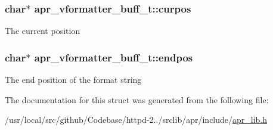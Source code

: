 \subsubsection[{\texorpdfstring{curpos}{curpos}}]{\setlength{\rightskip}{0pt plus 5cm}char$\ast$ apr\+\_\+vformatter\+\_\+buff\+\_\+t\+::curpos}\hypertarget{structapr__vformatter__buff__t_aad69bb2ce382b39f55df6cc59039aee9}{}\label{structapr__vformatter__buff__t_aad69bb2ce382b39f55df6cc59039aee9}
The current position 
\subsubsection[{\texorpdfstring{endpos}{endpos}}]{\setlength{\rightskip}{0pt plus 5cm}char$\ast$ apr\+\_\+vformatter\+\_\+buff\+\_\+t\+::endpos}\hypertarget{structapr__vformatter__buff__t_ab4884e759f4285c72df93e0d63022675}{}\label{structapr__vformatter__buff__t_ab4884e759f4285c72df93e0d63022675}
The end position of the format string 

The documentation for this struct was generated from the following file\+:\begin{DoxyCompactItemize}
\item 
/usr/local/src/github/\+Codebase/httpd-\/2../srclib/apr/include/\hyperlink{apr__lib_8h}{apr\+\_\+lib.\+h}\end{DoxyCompactItemize}
